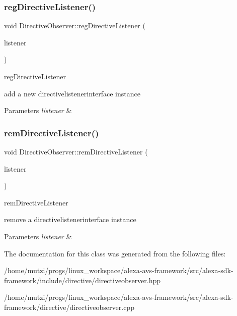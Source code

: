 \subsubsection{\texorpdfstring{reg\+Directive\+Listener()}{regDirectiveListener()}}
{\footnotesize\ttfamily void Directive\+Observer\+::reg\+Directive\+Listener (\begin{DoxyParamCaption}\item[{\hyperlink{classdirective_1_1DirectiveListenerInterface}{Directive\+Listener\+Interface} $\ast$}]{listener }\end{DoxyParamCaption})}



reg\+Directive\+Listener 

add a new directivelistenerinterface instance 
\begin{DoxyParams}{Parameters}
{\em listener} & \\
\hline
\end{DoxyParams}
\mbox{\label{classdirective_1_1DirectiveObserver_a27624c4fa56f49e781338f61cd6cf125}} 
\subsubsection{\texorpdfstring{rem\+Directive\+Listener()}{remDirectiveListener()}}
{\footnotesize\ttfamily void Directive\+Observer\+::rem\+Directive\+Listener (\begin{DoxyParamCaption}\item[{\hyperlink{classdirective_1_1DirectiveListenerInterface}{Directive\+Listener\+Interface} $\ast$}]{listener }\end{DoxyParamCaption})}



rem\+Directive\+Listener 

remove a directivelistenerinterface instance 
\begin{DoxyParams}{Parameters}
{\em listener} & \\
\hline
\end{DoxyParams}


The documentation for this class was generated from the following files\+:\begin{DoxyCompactItemize}
\item 
/home/mutzi/progs/linux\+\_\+workspace/alexa-\/avs-\/framework/src/alexa-\/sdk-\/framework/include/directive/directiveobserver.\+hpp\item 
/home/mutzi/progs/linux\+\_\+workspace/alexa-\/avs-\/framework/src/alexa-\/sdk-\/framework/directive/directiveobserver.\+cpp\end{DoxyCompactItemize}
